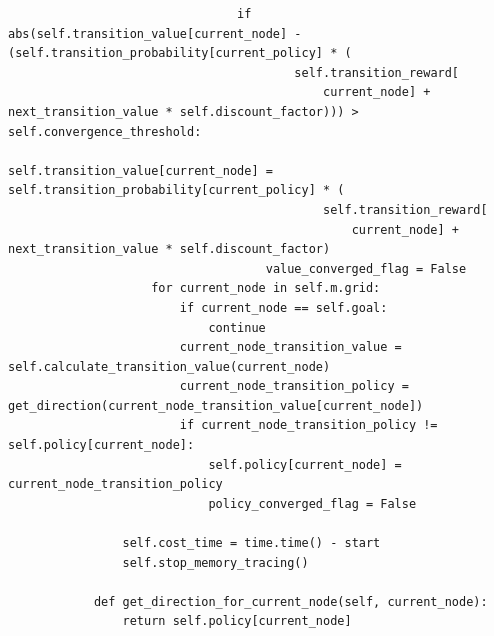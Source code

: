 \documentclass{article}
\begin{document}
\begin{lstlisting}
                                if abs(self.transition_value[current_node] - (self.transition_probability[current_policy] * (
                                        self.transition_reward[
                                            current_node] + next_transition_value * self.discount_factor))) > self.convergence_threshold:
                                    self.transition_value[current_node] = self.transition_probability[current_policy] * (
                                            self.transition_reward[
                                                current_node] + next_transition_value * self.discount_factor)
                                    value_converged_flag = False
                    for current_node in self.m.grid:
                        if current_node == self.goal:
                            continue
                        current_node_transition_value = self.calculate_transition_value(current_node)
                        current_node_transition_policy = get_direction(current_node_transition_value[current_node])
                        if current_node_transition_policy != self.policy[current_node]:
                            self.policy[current_node] = current_node_transition_policy
                            policy_converged_flag = False
        
                self.cost_time = time.time() - start
                self.stop_memory_tracing()
        
            def get_direction_for_current_node(self, current_node):
                return self.policy[current_node]
\end{lstlisting}
\end{document}
